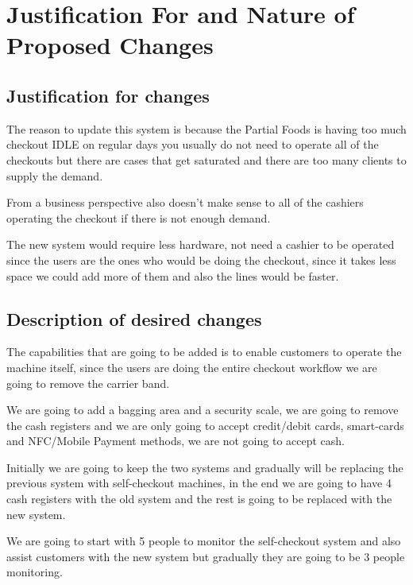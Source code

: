 \section{Justification For and  Nature of Proposed Changes}

\subsection{Justification for changes}

The reason to update this system is because the Partial Foods is having too 
much checkout IDLE on regular days you usually do not need to operate all of 
the checkouts but there are cases that get saturated and there are too many 
clients to supply the demand. \newline

From a business perspective also doesn’t make sense to all of the cashiers 
operating the checkout if there is not enough demand. \newline

The new system would require less hardware, not need a cashier to be operated 
since the users are the ones who would be doing the checkout, since it takes 
less space we could add more of them and also the 
lines would be faster. \newline


\subsection{Description of desired changes}

The capabilities that are going to be added is to enable customers to operate 
the machine itself, since the users are doing the entire checkout workflow 
we are going to remove the carrier band.  \newline

We are going to add a bagging area and a security scale, we are going to 
remove the cash registers and we are only going to accept credit/debit cards, 
smart-cards and NFC/Mobile Payment methods, we are not 
going to accept cash.  \newline

Initially we are going to keep the two systems and gradually will be replacing 
the previous system with self-checkout machines, in the end we are going to 
have 4 cash registers with the old system and the rest is going to be replaced 
with the new system.  \newline

We are going to start with 5 people to monitor the self-checkout system and 
also assist customers with the new system but gradually they are going to be 
3 people monitoring.  \newline

